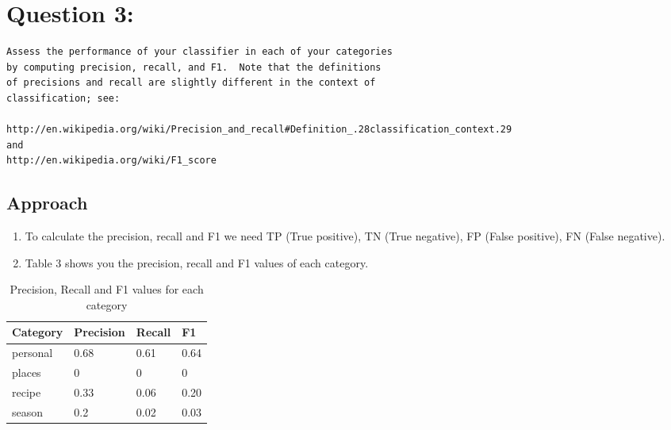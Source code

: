 \documentclass[12pt]{article}
\begin{document}
\newpage



\section{Question 3:}
\begin{verbatim}
Assess the performance of your classifier in each of your categories
by computing precision, recall, and F1.  Note that the definitions
of precisions and recall are slightly different in the context of
classification; see:

http://en.wikipedia.org/wiki/Precision_and_recall#Definition_.28classification_context.29
and
http://en.wikipedia.org/wiki/F1_score
\end{verbatim}

\subsection{Approach}
\begin{enumerate}
    \item To calculate the precision, recall and F1 we need TP (True positive), TN (True negative), FP (False positive), FN (False negative).
    \item Table 3 shows you the precision, recall and F1 values of each category.
  \end{enumerate}  
\newpage

\begin{center}
\begin{table}
\small
\begin{tabular}{ | p{3.0cm} | p{2.0cm} |p{2.0cm} | p{2.0cm} | }\hline
\textbf{Category} & \textbf{Precision} & \textbf{Recall} & \textbf{F1} \\\hline
 personal& 0.68 & 0.61 &0.64  \\\hline
places & 0 &0 & 0 \\\hline
 recipe&  0.33& 0.06 &0.20  \\\hline
 season & 0.2 & 0.02 & 0.03 \\\hline

\end{tabular}
\caption{Precision, Recall and F1 values for each category}
\end{table}
\end{center}



\newpage


\cite{*}
\newpage
\end{document}
